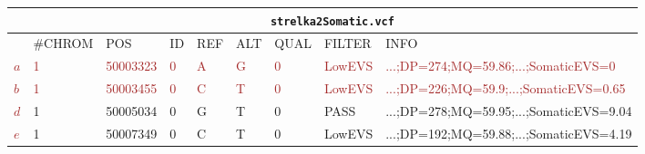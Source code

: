 \begin{tabular}{l|llllllll|}
\footnotesize &
\multicolumn{8}{c}{\footnotesize \texttt{strelka2Somatic.vcf}} \\
\hline
 & \#CHROM & POS & ID & REF & ALT & QUAL & FILTER & INFO \\
\textcolor{brown}{\(a\)} &
\textcolor{brown}{1} &
\textcolor{brown}{50003323} &
\textcolor{brown}{0} &
\textcolor{brown}{A} &
\textcolor{brown}{G} &
\textcolor{brown}{0} &
\textcolor{brown}{LowEVS} &
\textcolor{brown}{...;DP=274;MQ=59.86;...;SomaticEVS=0} \\
\textcolor{brown}{\(b\)} &
\textcolor{brown}{1} &
\textcolor{brown}{50003455} &
\textcolor{brown}{0} &
\textcolor{brown}{C} &
\textcolor{brown}{T} &
\textcolor{brown}{0} &
\textcolor{brown}{LowEVS} &
\textcolor{brown}{...;DP=226;MQ=59.9;...;SomaticEVS=0.65} \\
\textcolor{brown}{\(d\)} &
\textcolor{cyan!50!brown}{1} &
\textcolor{cyan!50!brown}{50005034} &
\textcolor{cyan!50!brown}{0} &
\textcolor{cyan!50!brown}{G} &
\textcolor{cyan!50!brown}{T} &
\textcolor{cyan!50!brown}{0} &
\textcolor{cyan!50!brown}{PASS} &
\textcolor{cyan!50!brown}{...;DP=278;MQ=59.95;...;SomaticEVS=9.04} \\
\textcolor{brown}{\(e\)} &
\textcolor{cyan!50!brown}{1} &
\textcolor{cyan!50!brown}{50007349} &
\textcolor{cyan!50!brown}{0} &
\textcolor{cyan!50!brown}{C} &
\textcolor{cyan!50!brown}{T} &
\textcolor{cyan!50!brown}{0} &
\textcolor{cyan!50!brown}{LowEVS} &
\textcolor{cyan!50!brown}{...;DP=192;MQ=59.88;...;SomaticEVS=4.19} \\
\hline
\end{tabular}
\normalsize
